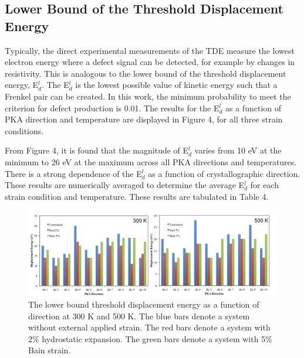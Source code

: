 \documentclass[review]{elsarticle}
\begin{document}
\FloatBarrier
\subsection{Lower Bound of the Threshold Displacement Energy}

Typically, the direct experimental measurements of the TDE measure the lowest electron energy where a defect signal can be detected, for example by changes in resistivity.  This is analogous to the lower bound of the threshold displacement energy, E$^{l}_{d}$.  The E$^{l}_{d}$ is the lowest possible value of kinetic energy such that a Frenkel pair can be created.  In this work, the minimum probability to meet the criterion for defect production is 0.01.   The results for the E$^{l}_{d}$ as a function of PKA direction and temperature are displayed in Figure 4, for all three strain conditions.  

From Figure 4, it is found that the magnitude of E$^{l}_{d}$ varies from 10 eV at the minimum to 26 eV at the maximum across all PKA directions and temperatures.  There is a strong dependence of the E$^{l}_{d}$ as a function of crystallographic direction.  These results are numerically averaged to determine the average E$^{l}_{d}$ for each strain condition and temperature.  These results are tabulated in Table 4.

\begin{figure}[hp]
   \centering
   \includegraphics[width=\textwidth]{bar_charts2.png} %
   \caption{The lower bound threshold displacement energy as a function of direction at 300 K and 500 K.  The blue bars denote a system without external applied strain.  The red bars denote a system with 2$\%$ hydrostatic expansion. The green bars denote a system with 5$\%$ Bain strain.}
   \label{fig:example}
\end{figure}


\FloatBarrier
\end{document}
